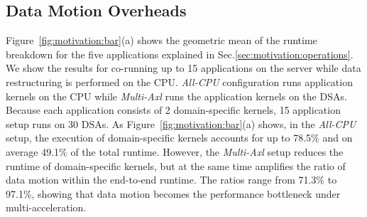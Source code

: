 \subsection{Data Motion Overheads}
%
Figure~\ref{fig:motivation:bar}(a) shows the geometric mean of the runtime breakdown for the five %
applications explained in Sec.\ref{sec:motivation:operations}. We show the results for co-running up to 15 applications on the server while data restructuring is performed on the CPU. \emph{All-CPU} configuration runs application kernels on the CPU while \emph{Multi-Axl} runs the application kernels on the DSAs. Because each application consists of 2 domain-specific kernels, 15 application setup runs on 30 DSAs.
%
As Figure~\ref{fig:motivation:bar}(a) shows, in the \emph{All-CPU} setup, the execution of domain-specific kernels accounts for up to 78.5\% and on average 49.1\% of the total runtime.
%
However, the \emph{Multi-Axl} setup reduces the runtime of domain-specific kernels, but at the same time amplifies the ratio of data motion within the end-to-end runtime.
%
The ratios range from 71.3\% to 97.1\%, showing that data motion becomes the performance bottleneck under multi-acceleration.
%
%

